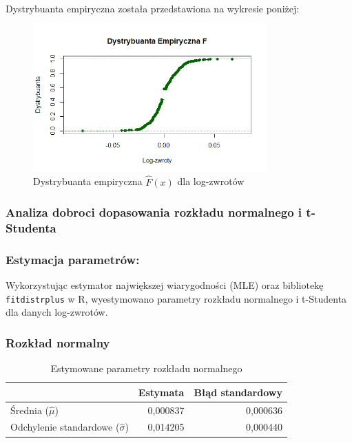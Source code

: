 \documentclass[a4paper,11pt]{article}
\begin{document}
Dystrybuanta empiryczna została przedstawiona na wykresie poniżej:

\begin{figure}[H]
    \centering
    \includegraphics[width=0.8\textwidth]{./Wojtek/dystrybuanta-empiryczna.png}
    \caption{Dystrybuanta empiryczna $\hat{F}(x)$ dla log-zwrotów}
    \label{fig:dystrybuanta_empiryczna}
\end{figure}

\subsubsection{Analiza dobroci dopasowania rozkładu normalnego i t-Studenta}

\subsubsection{Estymacja parametrów:}

Wykorzystując estymator największej wiarygodności (MLE) oraz bibliotekę \texttt{fitdistrplus} w R, wyestymowano parametry rozkładu normalnego i t-Studenta dla danych log-zwrotów.

\subsubsection{Rozkład normalny}

\begin{table}[H]
    \centering
    \begin{tabular}{|l|r|r|}
        \hline
        & \textbf{Estymata} & \textbf{Błąd standardowy} \\
        \hline
        Średnia ($\hat{\mu}$) & 0,000837 & 0,000636 \\
        Odchylenie standardowe ($\hat{\sigma}$) & 0,014205 & 0,000440 \\
        \hline
    \end{tabular}
    \caption{Estymowane parametry rozkładu normalnego}
    \label{tab:fit_norm}
\end{table}
\end{document}
